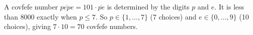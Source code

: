 A covfefe number $\overline{pepe}=101\cdot\overline{pe}$ is determined by the digits $p$ and $e$. It is less than $8000$ exactly when $p\le7$. So $p\in\{1,\dots,7\}$ (7 choices) and $e\in\{0,\dots,9\}$ (10 choices), giving $7\cdot10=\boxed{70}$ covfefe numbers.
